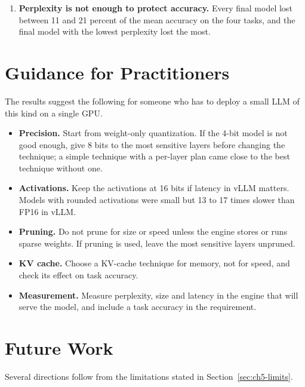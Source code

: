 \begin{enumerate}
  \item \textbf{Perplexity is not enough to protect accuracy.} Every final model lost between 11 and 21 percent of the mean accuracy on the four tasks, and the final model with the lowest perplexity lost the most.
\end{enumerate}

\section{Guidance for Practitioners}
\label{sec:ch6-guidance}

The results suggest the following for someone who has to deploy a small LLM of this kind on a single GPU.

\begin{itemize}
  \item \textbf{Precision.} Start from weight-only quantization. If the 4-bit model is not good enough, give 8 bits to the most sensitive layers before changing the technique; a simple technique with a per-layer plan came close to the best technique without one.
  \item \textbf{Activations.} Keep the activations at 16 bits if latency in vLLM matters. Models with rounded activations were small but 13 to 17 times slower than FP16 in vLLM.
  \item \textbf{Pruning.} Do not prune for size or speed unless the engine stores or runs sparse weights. If pruning is used, leave the most sensitive layers unpruned.
  \item \textbf{KV cache.} Choose a KV-cache technique for memory, not for speed, and check its effect on task accuracy.
  \item \textbf{Measurement.} Measure perplexity, size and latency in the engine that will serve the model, and include a task accuracy in the requirement.
\end{itemize}

\section{Future Work}
\label{sec:ch6-future}

Several directions follow from the limitations stated in Section~\ref{sec:ch5-limits}.

